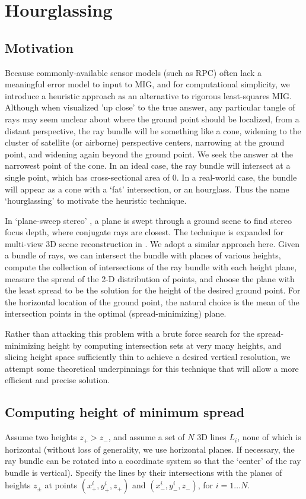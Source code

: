 \documentclass[10pt]{amsart}
\begin{document}
\section{Hourglassing\label{hourglassing}}
\subsection{Motivation}
Because commonly-available sensor models (such as RPC) often lack a meaningful
error model to input to MIG, and for computational simplicity, we introduce a
heuristic approach as an alternative to rigorous least-squares MIG. Although
when visualized 'up close' to the true answer, any particular tangle of rays may
seem unclear about where the ground point should be localized, from a distant
perspective, the ray bundle will be something like a cone, widening to the
cluster of satellite (or airborne) perspective centers, narrowing at the ground
point, and widening again beyond the ground point. We seek the answer at the
narrowest point of the cone. In an ideal case, the ray bundle will intersect at
a single point, which has cross-sectional area of 0. In a real-world case, the
bundle will appear as a cone with a `fat' intersection, or an hourglass. Thus
the name `hourglassing' to motivate the heuristic technique.

In `plane-sweep stereo' \cite{PLANE_SWEEP}, a plane is swept through a ground
scene to find stereo focus depth, where conjugate rays are closest. The
technique is expanded for multi-view 3D scene reconstruction in
\cite{PLANE_COLLINS}. We adopt a similar approach here. Given a bundle of rays,
we can intersect the bundle with planes of various heights, compute the
collection of intersections of the ray bundle with each height plane, measure
the spread of the 2-D distribution of points, and choose the plane with the
least spread to be the solution for the height of the desired ground point. For
the horizontal location of the ground point, the natural choice is the mean of
the intersection points in the optimal (spread-minimizing) plane.

Rather than attacking this problem with a brute force search for the
spread-minimizing height by computing intersection sets at very many heights,
and slicing height space sufficiently thin to achieve a desired vertical
resolution, we attempt some theoretical underpinnings for this technique that
will allow a more efficient and precise solution.

\subsection{Computing height of minimum spread\label{poly}}
Assume two heights $z_{+} > z_{-}$, and assume a set of $N$ 3D lines $L_i$, none
of which is horizontal (without loss of generality, we use horizontal planes. If
necessary, the ray bundle can be rotated into a coordinate system so that the
`center' of the ray bundle is vertical). Specify the lines by their
intersections with the planes of heights $z_\pm$ at points
$(x_{+}^{i},y_{+}^{i}, z_+)$ and $(x_{-}^{i},y_{-}^{i}, z_-)$, for $i=1\ldots
N$.
\end{document}
